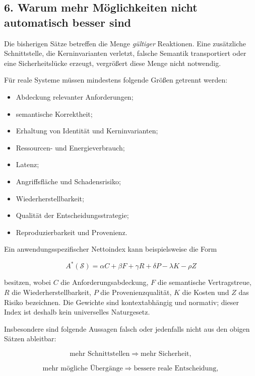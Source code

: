 \documentclass[
  10pt,
  a4paper,
]{article}
\providecommand{\tightlist}{%
  \setlength{\itemsep}{0pt}\setlength{\parskip}{0pt}}
\begin{document}
\hypertarget{warum-mehr-muxf6glichkeiten-nicht-automatisch-besser-sind}{%
\subsection{6. Warum mehr Möglichkeiten nicht automatisch besser
sind}\label{warum-mehr-muxf6glichkeiten-nicht-automatisch-besser-sind}}

Die bisherigen Sätze betreffen die Menge \emph{gültiger} Reaktionen.
Eine zusätzliche Schnittstelle, die Kerninvarianten verletzt, falsche
Semantik transportiert oder eine Sicherheitslücke erzeugt, vergrößert
diese Menge nicht notwendig.

Für reale Systeme müssen mindestens folgende Größen getrennt werden:

\begin{itemize}
\tightlist
\item
  Abdeckung relevanter Anforderungen;
\item
  semantische Korrektheit;
\item
  Erhaltung von Identität und Kerninvarianten;
\item
  Ressourcen- und Energieverbrauch;
\item
  Latenz;
\item
  Angriffsfläche und Schadensrisiko;
\item
  Wiederherstellbarkeit;
\item
  Qualität der Entscheidungsstrategie;
\item
  Reproduzierbarkeit und Provenienz.
\end{itemize}

Ein anwendungsspezifischer Nettoindex kann beispielsweise die Form

\[
A^*(\mathcal S)
=
\alpha C
+\beta F
+\gamma R
+\delta P
-\lambda K
-\rho Z
\]

besitzen, wobei \(C\) die Anforderungsabdeckung, \(F\) die semantische
Vertragstreue, \(R\) die Wiederherstellbarkeit, \(P\) die
Provenienzqualität, \(K\) die Kosten und \(Z\) das Risiko bezeichnen.
Die Gewichte sind kontextabhängig und normativ; dieser Index ist deshalb
kein universelles Naturgesetz.

Insbesondere sind folgende Aussagen falsch oder jedenfalls nicht aus den
obigen Sätzen ableitbar:

\[
\text{mehr Schnittstellen} \Longrightarrow \text{mehr Sicherheit},
\]

\[
\text{mehr mögliche Übergänge} \Longrightarrow \text{bessere reale Entscheidung},
\]
\end{document}
